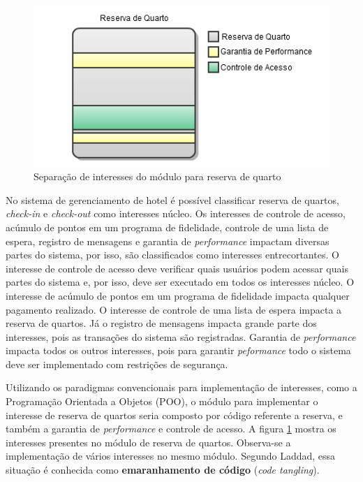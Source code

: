 \begin{figure}[!hb]
	\centering
	\includegraphics{img/context_aspect_concerns.png}
	\caption{Separação de interesses do módulo para reserva de quarto}\label{fig:context_aspect_concerns}
\end{figure}

No sistema de gerenciamento de hotel é possível classificar reserva de quartos, \textit{check-in} e \textit{check-out} como interesses núcleo.
Os interesses de controle de acesso, acúmulo de pontos em um programa de fidelidade, controle de uma lista de espera, registro de mensagens e garantia
de \textit{performance} impactam diversas partes do sistema, por isso, são classificados como interesses entrecortantes. O interesse de controle de acesso deve 
verificar quais usuários podem acessar quais partes do sistema e, por isso, deve ser executado em todos os interesses núcleo. O interesse de
acúmulo de pontos em um programa de fidelidade impacta qualquer pagamento realizado. O interesse de controle de uma lista de espera impacta a
reserva de quartos. Já o registro de mensagens impacta grande parte dos interesses, pois as transações do sistema são registradas. Garantia de
\textit{performance} impacta todos os outros interesses, pois para garantir \textit{peformance} todo o sistema deve ser implementado com restrições
de segurança.

Utilizando os paradigmas convencionais para implementação de interesses, como a Programação Orientada a Objetos (POO), o módulo
para implementar o interesse de reserva de quartos seria composto  por código referente a reserva, e também a garantia de \textit{performance} e 
controle de acesso. A figura \ref{fig:context_aspect_concerns} mostra os interesses presentes no módulo de reserva de quartos. Observa-se a
implementação de vários interesses no mesmo módulo. Segundo Laddad\cite{Laddad:2003:AAP:993468}, essa situação é conhecida como \textbf{emaranhamento
de código} (\textit{code tangling}).

